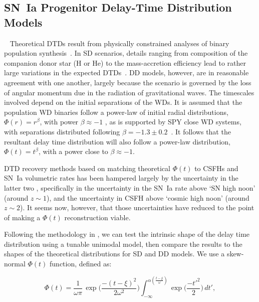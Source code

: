 \documentclass[apj, linenumbers]{aastex62}
\begin{document}
\subsection{SN~Ia Progenitor Delay-Time Distribution Models}~\label{sec:dtd}
Theoretical DTDs result from physically constrained analyses of binary population synthesis~\cite[see][ for a review]{Wang:2012a}.  In SD scenarios, details ranging from composition of the companion donor star (H or He) to the mass-accretion efficiency lead to rather large variations in the expected DTDs~\cite{Nelemans:2013}. DD models, however, are in reasonable agreement with one another, largely because the scenario is governed by the loss of angular momentum due in the radiation of gravitational waves. The timescales involved depend on the  initial separations of the WDs. It is assumed that the population WD binaries follow a power-law of initial radial distributions, $\Phi(r)=r^{\beta}$, with power $\beta\approx-1$ \citep{Opik:1924xr}, as is supported by SPY close WD systems, with separations distributed following $\beta=-1.3\pm0.2$~\citep{Maoz:2017zl}. It follows that the resultant delay time distribution will also follow a power-law distribution, $\Phi(t)=t^{\beta}$, with a power close to $\beta\approx-1$.

DTD recovery methods based on matching theoretical $\Phi(t)$ to CSFHs and SN~Ia volumetric rates has been hampered largely by the uncertainty in the latter two \citep{Dahlen:2008,Strolger:2010,Graur:2014,Rodney:2014fj}, specifically in the uncertainty in the SN~Ia rate above `SN high noon' (around $z\sim1$), and the uncertainty in CSFH above `cosmic high noon' (around $z\sim2$). It seems now, however, that those uncertainties have reduced to the point of making a $\Phi(t)$ reconstruction viable.

Following the methodology in \cite{Strolger:2010}, we can test the intrinsic shape of the delay time distribution using a tunable unimodal model, then compare the results to the shapes of the theoretical distributions for SD and DD models. We use a skew-normal $\Phi(t)$ function, defined as:

\begin{equation}
	\Phi(t)=\frac{1}{\omega\pi}\,\exp\biggl(\frac{-(t-\xi)^2}{2\omega^2}\biggr)\int_{-\infty}^{\alpha (\frac{t-\xi}{\omega})} \exp\biggl(\frac{-t'^2}{2}\biggr)\,dt',
\label{eqn:model}
\end{equation}
\end{document}
